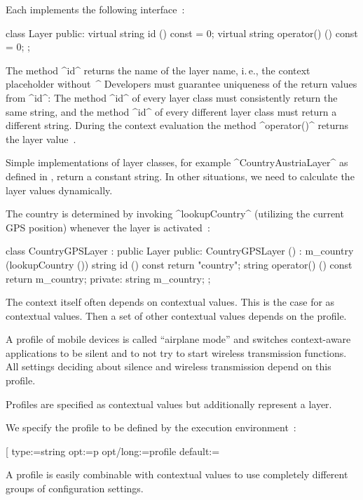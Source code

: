 Each  implements the following interface~\cite{raab2014program}:

\begin{code}[language=Cpp]
class Layer {
public:
	virtual string id () const = 0;
	virtual string operator() () const = 0;
};
\end{code}

The method ^id^ returns the name of the layer name, i.\,e., the context placeholder without~^%
Developers must guarantee uniqueness of the return values from ^id^:
The method ^id^ of every layer class must consistently return the same string, and the method ^id^ of every different layer class must return a different string.
During the context evaluation the method ^operator()^ returns the layer value~\cite{raab2014program}.


Simple implementations of layer classes, for example ^CountryAustriaLayer^ as defined in , return a constant string.
In other situations, we need to calculate the layer values dynamically.

\begin{example}
The country is determined by invoking ^lookupCountry^ (utilizing the current GPS position) whenever the layer is activated~\cite{raab2014program}:

\begin{code}[language=Cpp]
class CountryGPSLayer : public Layer
{
public:
	CountryGPSLayer () : m_country (lookupCountry ()) {}
	string id () const { return "country"; }
	string operator() () const { return m_country; }
private:
	string m_country;
};
\end{code}
\phantom{}
\end{example}


The context itself often depends on contextual values.
This is the case for  as contextual values.
Then a set of other contextual values depends on the profile.

\begin{example}
A profile of mobile devices is called ``airplane mode'' and switches context-aware applications to be silent and to not try to start wireless transmission functions.
All settings deciding about silence and wireless transmission depend on this profile.
\end{example}

Profiles are specified as contextual values but additionally represent a layer.

\begin{example}
We specify the profile to be defined by the execution environment~\cite{raab2014program}:

\begin{code}[morekeywords={long}]
[%
  type:=string
  opt:=p
  opt/long:=profile
  default:=
\end{code}

A profile is easily combinable with contextual values to use completely different groups of configuration settings.
\end{example}

